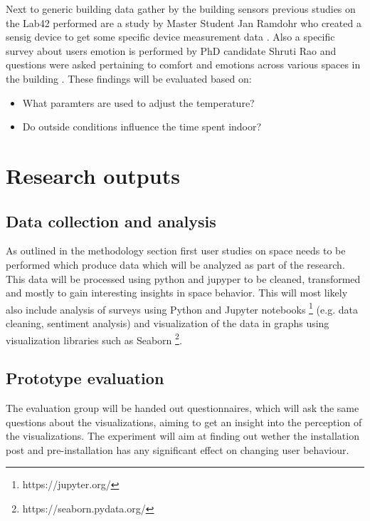 Next to generic building data gather by the building sensors previous studies on the Lab42 performed are a study by Master Student Jan Ramdohr who created a sensig device to get some specific device measurement data \cite{sensing}. Also a specific survey about users emotion is performed by PhD candidate Shruti Rao and questions were asked pertaining to comfort and emotions across various spaces in the building \cite{emotion}. These findings will be evaluated based on:

\begin{itemize}
  \item What paramters are used to adjust the temperature?
  \item Do outside conditions influence the time spent indoor?
\end{itemize}

\section{Research outputs}

\subsection{Data collection and analysis}

As outlined in the methodology section first user studies on space needs to be performed which produce data which will be analyzed as part of the research. This data will be processed using python and jupyper to be cleaned, transformed and mostly to gain interesting insights in space behavior. This will most likely also include analysis of surveys using Python and Jupyter notebooks \footnote{https://jupyter.org/} (e.g. data cleaning, sentiment analysis) and visualization of the data in graphs using visualization libraries such as Seaborn \footnote{https://seaborn.pydata.org/}.

\subsection{Prototype evaluation}

The evaluation group will be handed out questionnaires, which will ask the same questions about the visualizations, aiming to get an insight into the perception of the visualizations. The experiment will aim at finding out wether the installation post and pre-installation has any significant effect on changing user behaviour.
